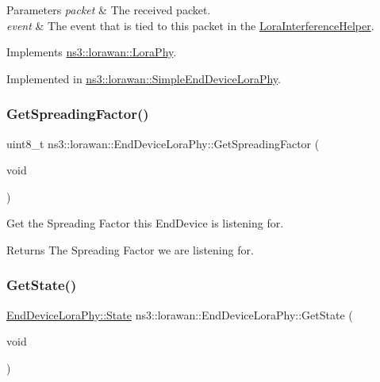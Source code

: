 \begin{DoxyParams}{Parameters}
{\em packet} & The received packet. \\
\hline
{\em event} & The event that is tied to this packet in the \hyperlink{classns3_1_1lorawan_1_1LoraInterferenceHelper}{Lora\+Interference\+Helper}. \\
\hline
\end{DoxyParams}


Implements \hyperlink{classns3_1_1lorawan_1_1LoraPhy_a719f749890c247abc3fda290d384c37f}{ns3\+::lorawan\+::\+Lora\+Phy}.



Implemented in \hyperlink{classns3_1_1lorawan_1_1SimpleEndDeviceLoraPhy_a03a9d0ffdd5f89991a61aa54e5a1e7ba}{ns3\+::lorawan\+::\+Simple\+End\+Device\+Lora\+Phy}.

\mbox{\label{classns3_1_1lorawan_1_1EndDeviceLoraPhy_ac950e8d56611b64152d206a273957f6c}} 
\subsubsection{\texorpdfstring{Get\+Spreading\+Factor()}{GetSpreadingFactor()}}
{\footnotesize\ttfamily uint8\+\_\+t ns3\+::lorawan\+::\+End\+Device\+Lora\+Phy\+::\+Get\+Spreading\+Factor (\begin{DoxyParamCaption}\item[{void}]{ }\end{DoxyParamCaption})}

Get the Spreading Factor this End\+Device is listening for.

\begin{DoxyReturn}{Returns}
The Spreading Factor we are listening for. 
\end{DoxyReturn}
\mbox{\label{classns3_1_1lorawan_1_1EndDeviceLoraPhy_ad7cb24138a7e9769aacb97aa2472feea}} 
\subsubsection{\texorpdfstring{Get\+State()}{GetState()}}
{\footnotesize\ttfamily \hyperlink{classns3_1_1lorawan_1_1EndDeviceLoraPhy_adc84e4ce7796e19f19f077df9592af15}{End\+Device\+Lora\+Phy\+::\+State} ns3\+::lorawan\+::\+End\+Device\+Lora\+Phy\+::\+Get\+State (\begin{DoxyParamCaption}\item[{void}]{ }\end{DoxyParamCaption})}

